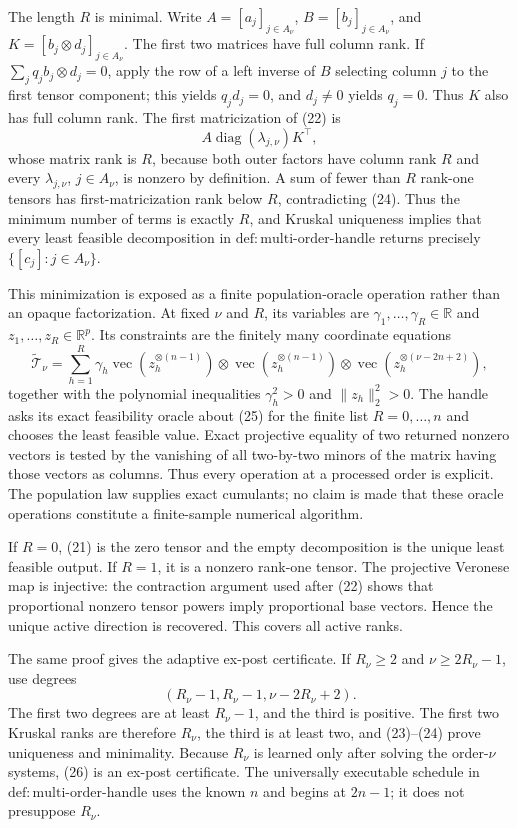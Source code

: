 The length \(R\) is minimal. Write \(A=[a_j]_{j\in A_\nu}\), \(B=[b_j]_{j\in A_\nu}\), and \(K=[b_j\otimes d_j]_{j\in A_\nu}\). The first two matrices have full column rank. If \(\sum_j q_jb_j\otimes d_j=0\), apply the row of a left inverse of \(B\) selecting column \(j\) to the first tensor component; this yields \(q_jd_j=0\), and \(d_j\ne0\) yields \(q_j=0\). Thus \(K\) also has full column rank. The first matricization of (22) is
\[
 A\operatorname{diag}(\lambda_{j,\nu})K^\top, \tag{24}
\]
whose matrix rank is \(R\), because both outer factors have column rank \(R\) and every \(\lambda_{j,\nu}\), \(j\in A_\nu\), is nonzero by definition. A sum of fewer than \(R\) rank-one tensors has first-matricization rank below \(R\), contradicting (24). Thus the minimum number of terms is exactly \(R\), and Kruskal uniqueness implies that every least feasible decomposition in \(\mathrm{def:multi\text{-}order\text{-}handle}\) returns precisely \(\{[c_j]:j\in A_\nu\}\).

This minimization is exposed as a finite population-oracle operation rather than an opaque factorization. At fixed \(\nu\) and \(R\), its variables are \(\gamma_1,\ldots,\gamma_R\in\mathbb R\) and \(z_1,\ldots,z_R\in\mathbb R^p\). Its constraints are the finitely many coordinate equations
\[
 \widetilde{\mathcal T}_\nu
 =\sum_{h=1}^{R}\gamma_h
 \operatorname{vec}(z_h^{\otimes(n-1)})\otimes
 \operatorname{vec}(z_h^{\otimes(n-1)})\otimes
 \operatorname{vec}(z_h^{\otimes(\nu-2n+2)}), \tag{25}
\]
together with the polynomial inequalities \(\gamma_h^2>0\) and \(\lVert z_h\rVert_2^2>0\). The handle asks its exact feasibility oracle about (25) for the finite list \(R=0,\ldots,n\) and chooses the least feasible value. Exact projective equality of two returned nonzero vectors is tested by the vanishing of all two-by-two minors of the matrix having those vectors as columns. Thus every operation at a processed order is explicit. The population law supplies exact cumulants; no claim is made that these oracle operations constitute a finite-sample numerical algorithm.

If \(R=0\), (21) is the zero tensor and the empty decomposition is the unique least feasible output. If \(R=1\), it is a nonzero rank-one tensor. The projective Veronese map is injective: the contraction argument used after (22) shows that proportional nonzero tensor powers imply proportional base vectors. Hence the unique active direction is recovered. This covers all active ranks.

The same proof gives the adaptive ex-post certificate. If \(R_\nu\ge2\) and \(\nu\ge2R_\nu-1\), use degrees
\[
 (R_\nu-1,R_\nu-1,\nu-2R_\nu+2). \tag{26}
\]
The first two degrees are at least \(R_\nu-1\), and the third is positive. The first two Kruskal ranks are therefore \(R_\nu\), the third is at least two, and (23)--(24) prove uniqueness and minimality. Because \(R_\nu\) is learned only after solving the order-\(\nu\) systems, (26) is an ex-post certificate. The universally executable schedule in \(\mathrm{def:multi\text{-}order\text{-}handle}\) uses the known \(n\) and begins at \(2n-1\); it does not presuppose \(R_\nu\).

